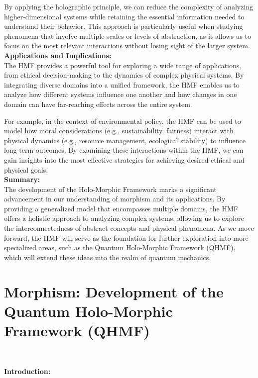 \documentclass{article}
\begin{document}
By applying the holographic principle, we can reduce the complexity of analyzing higher-dimensional systems while retaining the essential information needed to understand their behavior. This approach is particularly useful when studying phenomena that involve multiple scales or levels of abstraction, as it allows us to focus on the most relevant interactions without losing sight of the larger system.
\\

\textbf{Applications and Implications:}
\\

The HMF provides a powerful tool for exploring a wide range of applications, from ethical decision-making to the dynamics of complex physical systems. By integrating diverse domains into a unified framework, the HMF enables us to analyze how different systems influence one another and how changes in one domain can have far-reaching effects across the entire system.

For example, in the context of environmental policy, the HMF can be used to model how moral considerations (e.g., sustainability, fairness) interact with physical dynamics (e.g., resource management, ecological stability) to influence long-term outcomes. By examining these interactions within the HMF, we can gain insights into the most effective strategies for achieving desired ethical and physical goals.
\\

\textbf{Summary:}
\\

The development of the Holo-Morphic Framework marks a significant advancement in our understanding of morphism and its applications. By providing a generalized model that encompasses multiple domains, the HMF offers a holistic approach to analyzing complex systems, allowing us to explore the interconnectedness of abstract concepts and physical phenomena. As we move forward, the HMF will serve as the foundation for further exploration into more specialized areas, such as the Quantum Holo-Morphic Framework (QHMF), which will extend these ideas into the realm of quantum mechanics.
\\

\section*{Morphism: Development of the Quantum Holo-Morphic Framework (QHMF)}
\

\textbf{Introduction:}
\\
\end{document}

